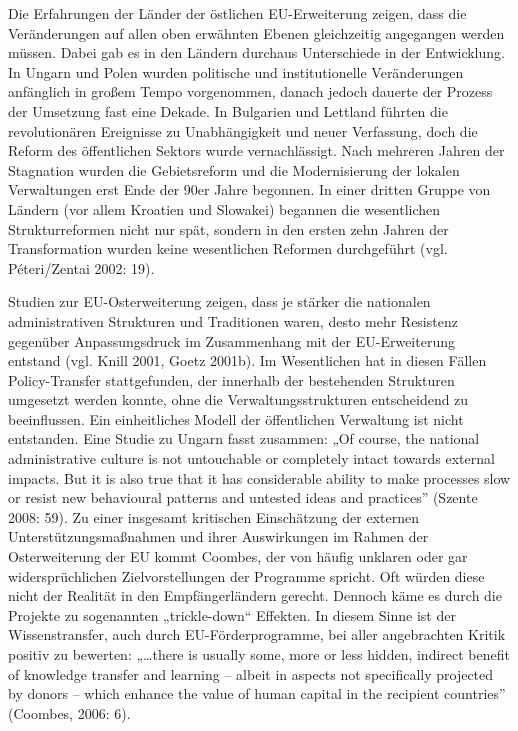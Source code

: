 Die Erfahrungen der Länder der östlichen EU-Erweiterung zeigen, dass die Veränderungen auf allen oben erwähnten Ebenen gleichzeitig angegangen werden müssen. Dabei gab es in den Ländern durchaus Unterschiede in der Entwicklung. In Ungarn und Polen wurden politische und institutionelle Veränderungen anfänglich in großem Tempo vorgenommen, danach jedoch dauerte der Prozess der Umsetzung fast eine Dekade. In Bulgarien und Lettland führten die revolutionären Ereignisse zu Unabhängigkeit und neuer Verfassung, doch die Reform des öffentlichen Sektors wurde vernachlässigt. Nach mehreren Jahren der Stagnation wurden die Gebietsreform und die Modernisierung der lokalen Verwaltungen erst Ende der 90er Jahre begonnen. In einer dritten Gruppe von Ländern (vor allem Kroatien und Slowakei) begannen die wesentlichen Strukturreformen nicht nur spät, sondern in den ersten zehn Jahren der Transformation wurden keine wesentlichen Reformen durchgeführt (vgl. Péteri/Zentai 2002: 19).  \par

Studien zur EU-Osterweiterung zeigen, dass je stärker die nationalen administrativen Strukturen und Traditionen waren, desto mehr Resistenz gegenüber Anpassungsdruck im Zusammenhang mit der EU-Erweiterung entstand (vgl. Knill 2001, Goetz 2001b). Im Wesentlichen hat in diesen Fällen Policy-Transfer stattgefunden, der innerhalb der bestehenden Strukturen umgesetzt werden konnte, ohne die Verwaltungsstrukturen entscheidend zu beeinflussen. Ein einheitliches Modell der öffentlichen Verwaltung ist nicht entstanden. Eine Studie zu Ungarn fasst zusammen: „Of course, the national administrative culture is not untouchable or completely intact towards external impacts. But it is also true that it has considerable ability to make processes slow or resist new behavioural patterns and untested ideas and practices” (Szente 2008: 59). Zu einer insgesamt kritischen Einschätzung der externen Unterstützungsmaßnahmen und ihrer Auswirkungen im Rahmen der Osterweiterung der EU kommt Coombes, der von häufig unklaren oder gar widersprüchlichen Zielvorstellungen der Programme spricht. Oft würden diese nicht der Realität in den Empfängerländern gerecht. Dennoch käme es durch die Projekte zu sogenannten „trickle-down“ Effekten. In diesem Sinne ist der Wissenstransfer, auch durch EU-Förderprogramme, bei aller angebrachten Kritik positiv zu bewerten: „…there is usually some, more or less hidden, indirect benefit of knowledge transfer and learning – albeit in aspects not specifically projected by donors – which enhance the value of human capital in the recipient countries” (Coombes, 2006: 6). \par


